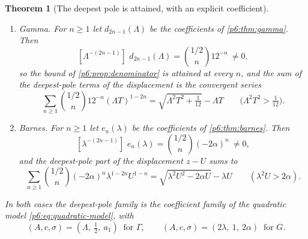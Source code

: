 \documentclass[11pt,a4paper,oneside]{book}
\theoremstyle{plain}
\newtheorem{theorem}{Theorem}[chapter]
\theoremstyle{definition}
\theoremstyle{remark}
\newcommand{\Coef}[1]{[#1]\,}
\begin{document}
\begin{theorem}[The deepest pole is attained, with an explicit coefficient]
\label{p6:thm:deepest-pole}
\leavevmode
\begin{enumerate}
\item \emph{Gamma.}  For $n\ge1$ let $d_{2n-1}(\Lambda)$ be the coefficients
of \cref{p6:thm:gamma}.  Then
\begin{equation}\label{p6:eq:gamma-deepest}
 \Coef{\Lambda^{-(2n-1)}}\,d_{2n-1}(\Lambda)
 =\binom{1/2}{n}12^{-n}\ \ne0,
\end{equation}
so the bound of \cref{p6:prop:denominator} is attained at every $n$, and the
sum of the deepest-pole terms of the displacement is the convergent series
\begin{equation}\label{p6:eq:gamma-deepest-resum}
 \sum_{n\ge1}\binom{1/2}{n}12^{-n}(\Lambda T)^{1-2n}
 =\sqrt{\Lambda^{2}T^{2}+\tfrac1{12}}-\Lambda T
 \qquad\bigl(\Lambda^{2}T^{2}>\tfrac1{12}\bigr).
\end{equation}
\item \emph{Barnes.}  For $n\ge1$ let $e_n(\lambda)$ be the coefficients of
\cref{p6:thm:barnes}.  Then
\begin{equation}\label{p6:eq:barnes-deepest}
 \Coef{\lambda^{-(2n-1)}}\,e_n(\lambda)
 =\binom{1/2}{n}(-2\alpha)^{n}\ \ne0,
\end{equation}
and the deepest-pole part of the displacement $z-U$ sums to
\begin{equation}\label{p6:eq:barnes-deepest-resum}
 \sum_{n\ge1}\binom{1/2}{n}(-2\alpha)^{n}\lambda^{1-2n}U^{1-n}
 =\sqrt{\lambda^{2}U^{2}-2\alpha U}-\lambda U
 \qquad(\lambda^{2}U>2\alpha).
\end{equation}
\end{enumerate}
In both cases the deepest-pole family is the coefficient family of the
quadratic model \eqref{p6:eq:quadratic-model}, with
\begin{equation}\label{p6:eq:deepest-dictionary}
 (A,c,\sigma)=(\Lambda,\ \tfrac12,\ a_1)\ \text{ for }\Gamma,
 \qquad
 (A,c,\sigma)=(2\lambda,\ 1,\ 2\alpha)\ \text{ for }G .
\end{equation}
\end{theorem}
\end{document}
